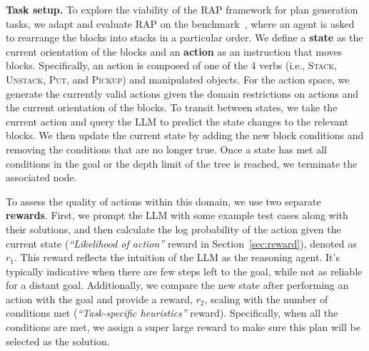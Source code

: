
\noindent \textbf{Task setup.}
To explore the viability of the RAP framework for plan generation tasks, we adapt and evaluate RAP on the \blocksworld benchmark~\cite{valmeekam2022large}, where an agent is asked to rearrange the blocks into stacks in a particular order. 
We define a \textbf{state} as the current orientation of the blocks and an \textbf{action} as an instruction that moves blocks. Specifically, an action is composed of one of the 4 verbs (i.e., \textsc{Stack}, \textsc{Unstack}, \textsc{Put}, and \textsc{Pickup}) and manipulated objects. For the action space, we generate the currently valid actions given the domain restrictions on actions and the current orientation of the blocks. To transit between states, we take the current action and query the LLM to predict the state changes to the relevant blocks. We then update the current state by adding the new block conditions and removing the conditions that are no longer true. Once a state has met all conditions in the goal or the depth limit of the tree is reached, we terminate the associated node.

To assess the quality of actions within this domain, we use two separate \textbf{rewards}. 
First, we prompt the LLM with some example test cases along with their solutions, and then calculate the log probability of the action given the current state (\textit{``Likelihood of action''} reward in Section~\ref{sec:reward}), denoted as $r_{1}$. This reward reflects the intuition of the LLM as the reasoning agent. It's typically indicative when there are few steps left to the goal, while not as reliable for a distant goal. Additionally, we compare the new state after performing an action with the goal and provide a reward, $r_{2}$, scaling with the number of conditions met (\textit{``Task-specific heuristics''} reward). Specifically, when all the conditions are met, we assign a super large reward to make sure this plan will be selected as the solution. %

